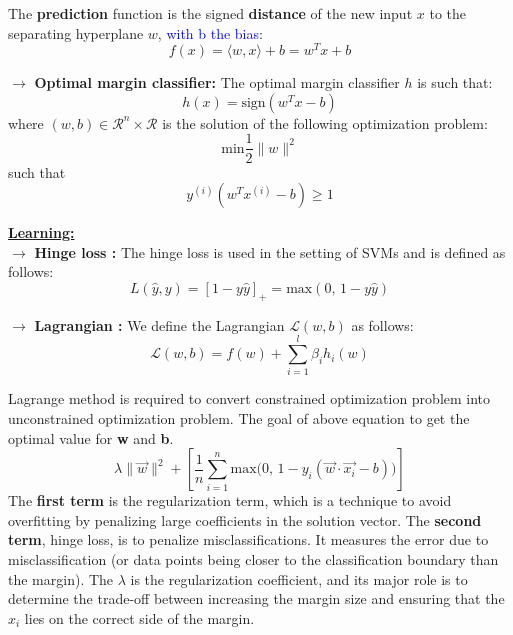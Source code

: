 \documentclass[letterpaper, 10.5pt,landscape]{article}
\begin{document}
\begin{multicols*}{3}
The \textbf{prediction} function is the signed \textbf{distance} of the new input $x$ to the separating hyperplane $w$, \textcolor{blue}{with b the bias}: 
\vspace{-4pt}
\[\boxed{f(x) = \langle w,x\rangle + b = w^{T} x + b} \] 
\vspace{-5pt}





\vspace{3pt}
$\rightarrow$ \textbf{Optimal margin classifier: } The optimal margin classifier $h$ is such that: 
\vspace{-4pt}
\[\boxed{h(x) = \text{sign}(w^{T}x - b)} \]
where $(w, b) \in \mathcal{R}^{n} \times \mathcal{R}$ is the  solution of the following optimization problem:
\vspace{-4pt}
\[ \boxed{\text{min}\frac{1}{2} \lVert {w} \rVert^{2} }\] such that \hspace{5pt} \[\boxed{y^{(i)} (w^{T}x^{(i)} - b) \geq 1}\]

\vspace{3pt}


\textbf{\underline{Learning:}} \\
$\rightarrow$ \textbf{Hinge loss : } The hinge loss is used in the setting of SVMs and is defined as follows:
\vspace{-2pt}
\[\boxed{L(\hat{y},y) = \left[1 - y\hat{y}  \right]_{+} = \text{max}(0, \, 1-y\hat{y})} \]

\vspace{3pt}
$\rightarrow$ \textbf{Lagrangian : } We define the Lagrangian $\mathcal{L}(w, b)$ as follows:
\vspace{-3pt}
\[\boxed{\mathcal{L}(w, b) = f(w) + \sum^{l}_{i=1} \beta_{i} h_{i} (w) }\]


Lagrange method is required to convert constrained optimization problem into unconstrained optimization problem. The goal of above equation to get the optimal value for \textbf{w} and \textbf{b}.
\vspace{-4pt}
\[\boxed{ \lambda \lVert \vec{w} \rVert^{2} + \left[ \frac{1}{n} \sum^{n}_{i=1} \text{max} \big(0, \, 1 - y_{i}(\vec{w} \cdot \vec{x_{i}} - b) \big)\right] }  \] 
The\textbf{ first term} is the regularization term, which is a technique to avoid overfitting by penalizing large coefficients in the solution vector. The \textbf{second term}, hinge loss, is to penalize misclassifications. It measures the error due to misclassification (or data points being closer to the classification boundary than the margin).  The $\lambda$ is the regularization coefficient, and its major role is to determine the trade-off between increasing the margin size and ensuring that the $x_{i}$ lies on the correct side of the margin.





\end{multicols*}
\end{document}
